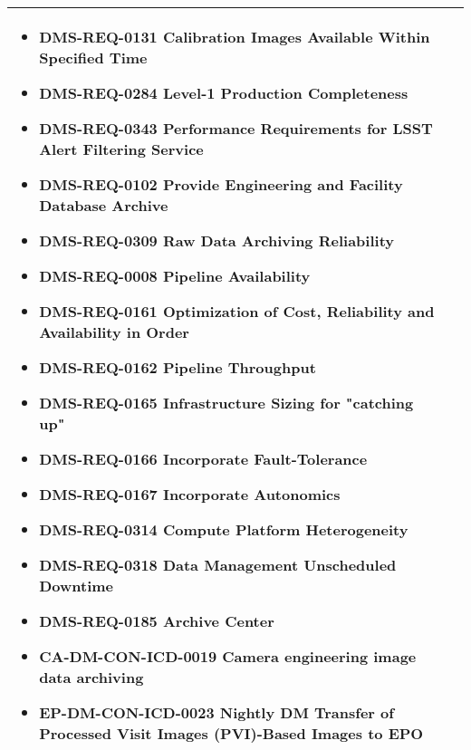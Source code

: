 \begin{xtabular}{lp{0.7\textwidth}}
\begin{itemize}
\item DMS-REQ-0131 Calibration Images Available Within Specified Time
\item DMS-REQ-0284 Level-1 Production Completeness
\item DMS-REQ-0343 Performance Requirements for LSST Alert Filtering Service
\item DMS-REQ-0102 Provide Engineering and Facility Database Archive
\item DMS-REQ-0309 Raw Data Archiving Reliability
\item DMS-REQ-0008 Pipeline Availability
\item DMS-REQ-0161 Optimization of Cost, Reliability and Availability in Order
\item DMS-REQ-0162 Pipeline Throughput
\item DMS-REQ-0165 Infrastructure Sizing for "catching up"
\item DMS-REQ-0166 Incorporate Fault-Tolerance
\item DMS-REQ-0167 Incorporate Autonomics
\item DMS-REQ-0314 Compute Platform Heterogeneity
\item DMS-REQ-0318 Data Management Unscheduled Downtime
\item DMS-REQ-0185 Archive Center
\item CA-DM-CON-ICD-0019 Camera engineering image data archiving
\item EP-DM-CON-ICD-0023 Nightly DM Transfer of Processed Visit Images (PVI)-Based Images to EPO
\end{itemize} \\ \hline
\end{xtabular}
